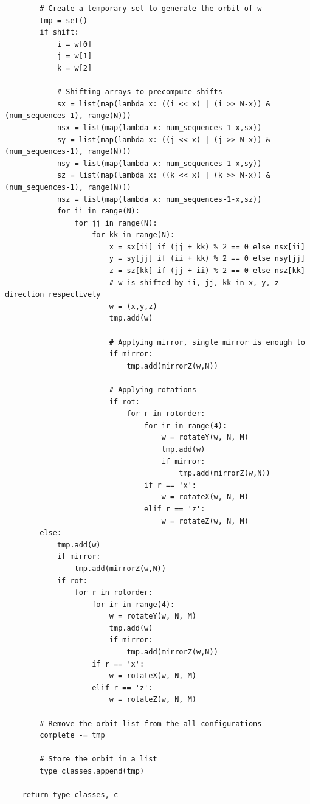 \documentclass[unnumsec,webpdf,contemporary,large]{oup-authoring-template}%
\theoremstyle{thmstyleone}%
\theoremstyle{thmstyletwo}%
\theoremstyle{thmstylethree}%
\begin{document}
\begin{lstlisting}
        # Create a temporary set to generate the orbit of w
        tmp = set()
        if shift:
            i = w[0]
            j = w[1]
            k = w[2]

            # Shifting arrays to precompute shifts
            sx = list(map(lambda x: ((i << x) | (i >> N-x)) & (num_sequences-1), range(N)))
            nsx = list(map(lambda x: num_sequences-1-x,sx))
            sy = list(map(lambda x: ((j << x) | (j >> N-x)) & (num_sequences-1), range(N)))
            nsy = list(map(lambda x: num_sequences-1-x,sy))
            sz = list(map(lambda x: ((k << x) | (k >> N-x)) & (num_sequences-1), range(N)))
            nsz = list(map(lambda x: num_sequences-1-x,sz))
            for ii in range(N):
                for jj in range(N):
                    for kk in range(N):
                        x = sx[ii] if (jj + kk) % 2 == 0 else nsx[ii]
                        y = sy[jj] if (ii + kk) % 2 == 0 else nsy[jj]
                        z = sz[kk] if (jj + ii) % 2 == 0 else nsz[kk]
                        # w is shifted by ii, jj, kk in x, y, z direction respectively
                        w = (x,y,z)
                        tmp.add(w)

                        # Applying mirror, single mirror is enough to
                        if mirror:
                            tmp.add(mirrorZ(w,N))

                        # Applying rotations
                        if rot:
                            for r in rotorder:
                                for ir in range(4):
                                    w = rotateY(w, N, M)
                                    tmp.add(w)
                                    if mirror:
                                        tmp.add(mirrorZ(w,N))
                                if r == 'x':
                                    w = rotateX(w, N, M)
                                elif r == 'z':
                                    w = rotateZ(w, N, M)
        else:
            tmp.add(w)
            if mirror:
                tmp.add(mirrorZ(w,N))
            if rot:
                for r in rotorder:
                    for ir in range(4):
                        w = rotateY(w, N, M)
                        tmp.add(w)
                        if mirror:
                            tmp.add(mirrorZ(w,N))
                    if r == 'x':
                        w = rotateX(w, N, M)
                    elif r == 'z':
                        w = rotateZ(w, N, M)

        # Remove the orbit list from the all configurations
        complete -= tmp

        # Store the orbit in a list
        type_classes.append(tmp)

    return type_classes, c
\end{lstlisting}
\end{document}
